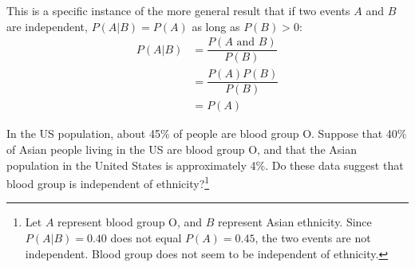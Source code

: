 This is a specific instance of the more general result that if two events $A$ and $B$ are independent, $P(A |B) = P(A)$ as long as $P(B) > 0$:
\begin{eqnarray*}
	P(A | B) &= \dfrac{P(A \text{ and } B)}{P(B)} \\
	     &= \dfrac{P(A) P(B)}{P(B)} \\
		 &= P(A)
\end{eqnarray*} 

\begin{exercise}
In the US population, about 45\% of people are blood group O. Suppose that 40\% of Asian people living in the US are blood group O, and that the Asian population in the United States is approximately 4\%. Do these data suggest that blood group is independent of ethnicity?\footnote{Let $A$ represent blood group O, and $B$ represent Asian ethnicity. Since $P(A|B) = 0.40$ does not equal $P(A) = 0.45$, the two events are not independent. Blood group does not seem to be independent of ethnicity.}
\end{exercise}


